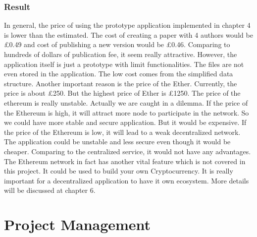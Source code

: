 \documentclass[openany,12pt]{ecsthesis}      %
\begin{document}
\subsubsection{Result}
In general, the price of using the prototype application implemented in chapter 4 is lower than the estimated.
The cost of creating a paper with 4 authors would be £0.49 and cost of publishing a new version would be £0.46.
Comparing to hundreds of dollars of publication fee, it seem really attractive. 
However, the application itself is just a prototype with limit functionalities. 
The files are not even stored in the application. 
The low cost comes from the simplified data structure. 
Another important reason is the price of the Ether. Currently, the price is about £250. 
But the highest price of Ether is £1250. The price of the ethereum is really unstable.
Actually we are caught in a dilemma. If the price of the Ethereum is high, 
it will attract more node to participate in the network. 
So we could have more stable and secure application. But it would be expensive.
If the price of the Ethereum is low, it will lead to a weak decentralized network.
The application could be unstable and less secure even though it would be cheaper. 
Comparing to the centralized service, it would not have any advantages. 
The Ethereum network in fact has another vital feature which is not covered in this project.
It could be used to build your own Cryptocurrency. 
It is really important for a decentralized application to have it own ecosystem. More details will be discussed at chapter 6.
\section{Project Management}
\end{document}

